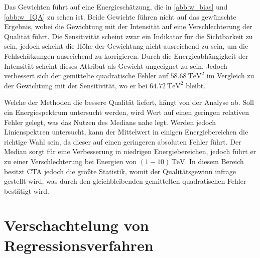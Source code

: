 Das Gewichten führt auf eine Energieschätzung, die in \autoref{abb:w_bias} und \autoref{abb:w_IQA} zu sehen ist.
Beide Gewichte führen nicht auf das gewünschte Ergebnis, wobei die Gewichtung mit der Intensität auf eine Verschlechterung der Qualität führt.
Die Sensitivität scheint zwar ein Indikator für die Sichtbarkeit zu sein, jedoch scheint die Höhe der Gewichtung nicht ausreichend zu sein, um
die Fehlschätzungen ausreichend zu korrigieren.
Durch die Energieabhängigkeit der Intensität scheint dieses Attribut als Gewicht ungeeignet zu sein.
Jedoch verbessert sich der gemittelte quadratische Fehler auf $\SI{58.68}{\tera\eV\squared}$ im Vergleich zu der Gewichtung mit der Sensitivität, wo er bei
$\SI{64.72}{\tera\eV\squared}$ bleibt.

Welche der Methoden die bessere Qualität liefert, hängt von der Analyse ab.
Soll ein Energiespektrum untersucht werden, wird Wert auf einen geringen relativen Fehler gelegt, was das Nutzen des Medians nahe legt.
Werden jedoch Linienspektren untersucht, kann der Mittelwert in einigen Energiebereichen die richtige Wahl sein, da dieser auf einen geringeren
absoluten Fehler führt.
Der Median sorgt für eine Verbesserung in niedrigen Energiebereichen, jedoch führt er zu einer Verschlechterung bei Energien von $(\num{1}-\num{10})\,\si{\tera\eV}$.
In diesem Bereich besitzt CTA jedoch die größte Statistik, womit der Qualitätsgewinn infrage gestellt wird, was durch den
gleichbleibenden gemittelten quadratischen Fehler bestätigt wird.


\section{Verschachtelung von Regressionsverfahren}
\label{sec:nest}


